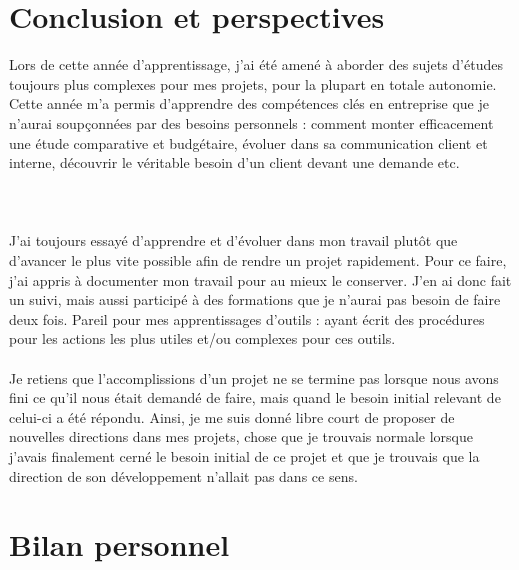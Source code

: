 \begin{sloppypar}
\newpage
\section{Conclusion et perspectives}
\label{conclusion}

Lors de cette année d'apprentissage, j'ai été amené à aborder des sujets d'études toujours plus complexes pour mes projets, pour la plupart en totale autonomie. Cette année m'a permis d'apprendre des compétences clés en entreprise que je n'aurai soupçonnées par des besoins personnels : comment monter efficacement une étude comparative et budgétaire, évoluer dans sa communication client et interne, découvrir le véritable besoin d'un client devant une demande etc.
\\ \\
\\ \\
J'ai toujours essayé d'apprendre et d'évoluer dans mon travail plutôt que d'avancer le plus vite possible afin de rendre un projet rapidement. Pour ce faire, j'ai appris à documenter mon travail pour au mieux le conserver. J'en ai donc fait un suivi, mais aussi participé à des formations que je n'aurai pas besoin de faire deux fois. Pareil pour mes apprentissages d'outils : ayant écrit des procédures pour les actions les plus utiles et/ou complexes pour ces outils.
\\ \\
Je retiens que l'accomplissions d'un projet ne se termine pas lorsque nous avons fini ce qu'il nous était demandé de faire, mais quand le besoin initial relevant de celui-ci a été répondu. Ainsi, je me suis donné libre court de proposer de nouvelles directions dans mes projets, chose que je trouvais normale lorsque j'avais finalement cerné le besoin initial de ce projet et que je trouvais que la direction de son développement n'allait pas dans ce sens.


\section{Bilan personnel}


\end{sloppypar}
